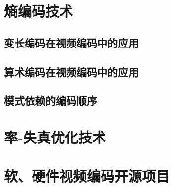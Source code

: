 \section{熵编码技术}
\subsection{变长编码在视频编码中的应用}
\subsection{算术编码在视频编码中的应用}
\subsection{模式依赖的编码顺序}

\section{率-失真优化技术}

\section{软、硬件视频编码开源项目}
